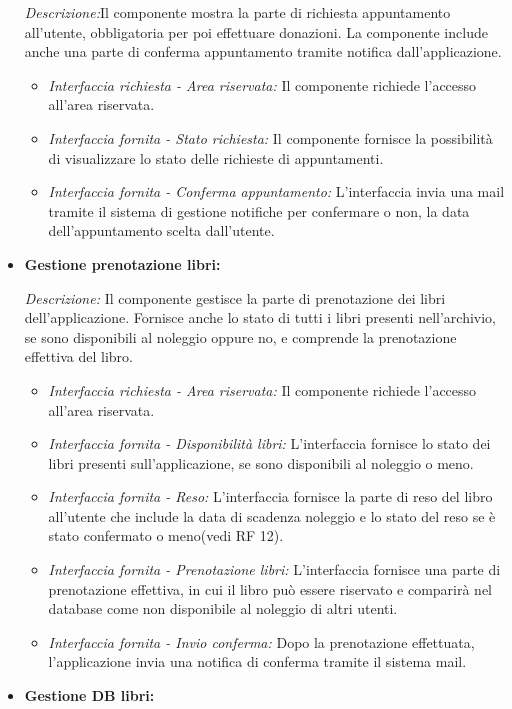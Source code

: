 \documentclass{article}
\begin{document}
\begin{itemize}
    \textit{Descrizione:}Il componente mostra la parte di richiesta appuntamento all’utente, obbligatoria per poi effettuare donazioni. La componente include anche una parte di conferma appuntamento tramite notifica dall’applicazione.
    
    \begin{itemize}
        \item \textit{Interfaccia richiesta - Area riservata:} Il componente richiede l’accesso all’area riservata.
        \item \textit{Interfaccia fornita - Stato richiesta:} Il componente fornisce la possibilità di visualizzare lo stato delle richieste di appuntamenti.
        \item \textit{Interfaccia fornita - Conferma appuntamento: }L’interfaccia invia una mail tramite il sistema di gestione notifiche per confermare o non,  la data dell’appuntamento scelta dall’utente. 
    \end{itemize}
    \item \textbf{Gestione prenotazione libri:}
    
    \textit{Descrizione:} Il componente gestisce la parte di prenotazione dei libri dell’applicazione. Fornisce anche lo stato di tutti i libri presenti nell’archivio, se sono disponibili al noleggio oppure no, e comprende la prenotazione effettiva del libro.
    
    \begin{itemize}
        \item \textit{Interfaccia richiesta - Area riservata:} Il componente richiede l’accesso all’area riservata.
        \item \textit{Interfaccia fornita - Disponibilità libri:} L’interfaccia fornisce lo stato dei libri presenti sull’applicazione, se sono disponibili al noleggio o meno.
        \item \textit{Interfaccia fornita - Reso:} L’interfaccia fornisce la parte di reso del libro all'utente che include la data di scadenza noleggio e lo stato del reso se è stato confermato o meno(vedi RF 12).
        \item \textit{Interfaccia fornita - Prenotazione libri:} L’interfaccia  fornisce una parte di prenotazione effettiva, in cui il libro può essere riservato e comparirà nel database come non disponibile al noleggio di altri utenti.
        \item \textit{Interfaccia fornita - Invio conferma:} Dopo la prenotazione effettuata, l’applicazione invia una notifica di conferma tramite il sistema mail.
    \end{itemize}
    \item \textbf{Gestione DB libri:}
    

\end{itemize}
\end{document}
